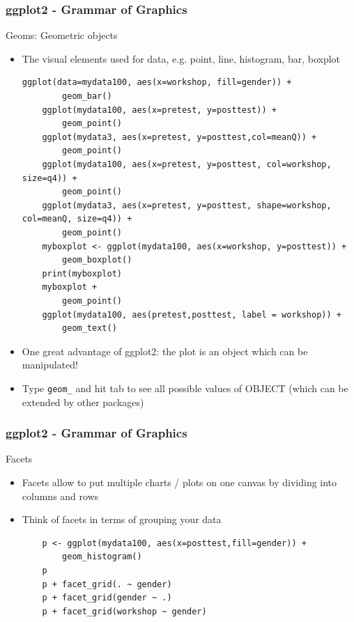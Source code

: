 \documentclass[xcolor={svgnames},10pt,
handout
]{beamer}
\begin{document}
\begin{frame}[fragile]\frametitle{ggplot2 - Grammar of Graphics}\footnotesize
Geoms: Geometric objects
\begin{itemize}
	\item The visual elements used for data, e.g. point, line, histogram, bar, boxplot	
	\begin{lstlisting}[basicstyle=\scriptsize]
	ggplot(data=mydata100, aes(x=workshop, fill=gender)) +
		geom_bar()
	ggplot(mydata100, aes(x=pretest, y=posttest)) +
 		geom_point()
 	ggplot(mydata3, aes(x=pretest, y=posttest,col=meanQ)) + 
 		geom_point()
	ggplot(mydata100, aes(x=pretest, y=posttest, col=workshop, size=q4)) + 
		geom_point()		
	ggplot(mydata3, aes(x=pretest, y=posttest, shape=workshop, col=meanQ, size=q4)) + 
		geom_point()		
	myboxplot <- ggplot(mydata100, aes(x=workshop, y=posttest)) +
		geom_boxplot()
	print(myboxplot)
	myboxplot +
		geom_point()
	ggplot(mydata100, aes(pretest,posttest, label = workshop)) + 
		geom_text()
	\end{lstlisting}
\item One great advantage of ggplot2: the plot is an object which can be manipulated!
\item Type \lstinline|geom_| and hit tab to see all possible values of OBJECT (which can be extended by other packages)
\end{itemize}
\end{frame}

\begin{frame}[fragile]\frametitle{ggplot2 - Grammar of Graphics}
Facets
\begin{itemize}
	\item Facets allow to put multiple charts / plots on one canvas by dividing into columns and rows
	\item Think of facets in terms of grouping your data
	\begin{lstlisting}
	p <- ggplot(mydata100, aes(x=posttest,fill=gender)) + 
		geom_histogram()
	p
	p +	facet_grid(. ~ gender)
	p +	facet_grid(gender ~ .)
	p + facet_grid(workshop ~ gender)
	\end{lstlisting}	
\end{itemize}
\end{frame}
\end{document}
